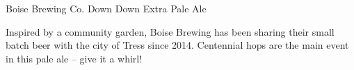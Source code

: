 \begin{recipie}{Boise Brewing Co. Down Down Extra Pale Ale}

\begin{aboutblock}
Inspired by a community garden, Boise Brewing has been sharing their small batch beer
with the city of Tress since 2014. Centennial hops are the main event in this pale ale -- give it a whirl!
\end{aboutblock}


\begin{methodandtiming}
 
\begin{mashsteps}
\end{mashsteps}

\end{methodandtiming}

\pagebreak

\begin{ingredientsblock}

\begin{malts}
\end{malts}

\begin{hops}
\end{hops}

\begin{yeasts}
\end{yeasts}

\end{ingredientsblock}

\end{recipie}